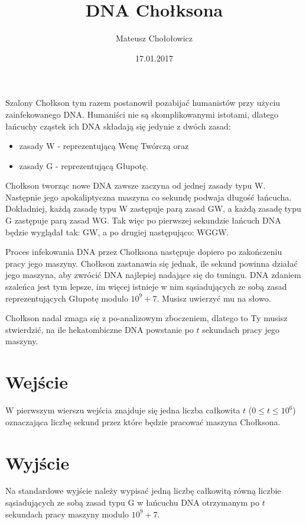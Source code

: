 \documentclass[zad,zawodnik,utf8]{sinol}
\title{DNA Chołksona}
\author{Mateusz Chołołowicz} %
\date{17.01.2017}
\begin{document}
\begin{tasktext}%
Szalony Chołkson tym razem postanowił pozabijać humanistów przy użyciu zainfekowanego DNA. Humaniści nie są skomplikowanymi istotami,
dlatego łańcuchy cząstek ich DNA składają się jedynie z dwóch zasad: 

\begin{itemize}
\item zasady W - reprezentującą Wenę Twórczą oraz
\item zasady G - reprezentującą Głupotę.
\end{itemize}

Chołkson tworząc nowe DNA zawsze zaczyna od jednej zasady typu W. Następnie jego apokaliptyczna maszyna co sekundę podwaja długość łańcucha.
Dokładniej, każdą zasadę typu W zastępuje parą zasad GW, a każdą zasadę typu G zastępuje parą zasad WG. Tak więc po pierwszej sekundzie
łańcuch DNA będzie wyglądał tak: GW, a po drugiej następująco: WGGW.

Proces infekowania DNA przez Chołksona następuje dopiero po zakończeniu pracy jego maszyny. Chołkson zastanawia się jednak, ile sekund powinna
działać jego maszyna, aby zwrócić DNA najlepiej nadające się do tuningu. DNA zdaniem szaleńca jest tym lepsze, im więcej istnieje w nim
sąsiadujących ze sobą zasad reprezentujących Głupotę modulo $10^9+7$. Musisz uwierzyć mu na słowo.

Chołkson nadal zmaga się z po-analizowym zboczeniem, dlatego to Ty musisz stwierdzić, na ile hekatombiczne DNA powstanie po $t$ sekundach pracy jego maszyny.

  \section{Wejście}
W pierwszym wierszu wejścia znajduje się jedna liczba całkowita $t$ ($0 \leq t \leq 10^6$) oznaczająca liczbę sekund przez które będzie pracować maszyna
Chołksona.

 \section{Wyjście}
Na standardowe wyjście należy wypisać jedną liczbę całkowitą równą liczbie sąsiadujących ze sobą zasad typu G w łańcuchu DNA
otrzymanym po $t$ sekundach pracy maszyny modulo $10^9+7$.

\makecompactexample

\end{tasktext}
\end{document}
